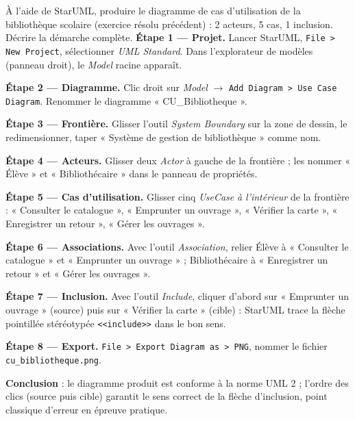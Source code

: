 \documentclass[11pt]{article}
\begin{document}
\begin{exoresolu}
À l'aide de StarUML, produire le diagramme de cas d'utilisation de la bibliothèque scolaire (exercice résolu précédent) : 2 acteurs, 5 cas, 1 inclusion. Décrire la démarche complète.
\tcblower
\textbf{Étape 1 — Projet.} Lancer StarUML, \texttt{File > New Project}, sélectionner \emph{UML Standard}. Dans l'explorateur de modèles (panneau droit), le \emph{Model} racine apparaît.

\textbf{Étape 2 — Diagramme.} Clic droit sur \emph{Model} $\rightarrow$ \texttt{Add Diagram > Use Case Diagram}. Renommer le diagramme « CU\_Bibliotheque ».

\textbf{Étape 3 — Frontière.} Glisser l'outil \emph{System Boundary} sur la zone de dessin, le redimensionner, taper « Système de gestion de bibliothèque » comme nom.

\textbf{Étape 4 — Acteurs.} Glisser deux \emph{Actor} à gauche de la frontière ; les nommer « Élève » et « Bibliothécaire » dans le panneau de propriétés.

\textbf{Étape 5 — Cas d'utilisation.} Glisser cinq \emph{UseCase} \emph{à l'intérieur} de la frontière : « Consulter le catalogue », « Emprunter un ouvrage », « Vérifier la carte », « Enregistrer un retour », « Gérer les ouvrages ».

\textbf{Étape 6 — Associations.} Avec l'outil \emph{Association}, relier Élève à « Consulter le catalogue » et « Emprunter un ouvrage » ; Bibliothécaire à « Enregistrer un retour » et « Gérer les ouvrages ».

\textbf{Étape 7 — Inclusion.} Avec l'outil \emph{Include}, cliquer d'abord sur « Emprunter un ouvrage » (source) puis sur « Vérifier la carte » (cible) : StarUML trace la flèche pointillée stéréotypée \texttt{<<include>>} dans le bon sens.

\textbf{Étape 8 — Export.} \texttt{File > Export Diagram as > PNG}, nommer le fichier \texttt{cu\_bibliotheque.png}.

\textbf{Conclusion} : le diagramme produit est conforme à la norme UML 2 ; l'ordre des clics (source puis cible) garantit le sens correct de la flèche d'inclusion, point classique d'erreur en épreuve pratique.
\end{exoresolu}
\end{document}
